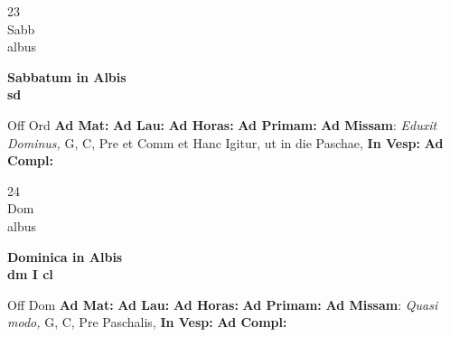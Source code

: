 \documentclass[10pt, openany]{book}
\begin{document}
    \begin{center}
        \begin{minipage}{3.5in}
            \vspace{2em}
            \begin{minipage}{0.5in}
                {\Huge 23} \\
                {\normalsize Sabb} \\
                {\normalsize albus}
            \end{minipage}
            \begin{minipage}{3.0in}
                \textbf{ \large Sabbatum in Albis \\
                \textnormal{\normalsize sd}} \\ 
            \end{minipage}
            \begin{justify}Off Ord
                \textbf{Ad Mat: }
                \textbf{Ad Lau: }
                \textbf{Ad Horas: }
                \textbf{Ad Primam: }\textbf{Ad Missam}: \textit{Eduxit Dominus,} G, C, Pre et Comm et Hanc Igitur, ut in die Paschae,  
                \textbf{In Vesp: }
                \textbf{Ad Compl: }
            \end{justify}
        \end{minipage}
    \end{center}

    \begin{center}
        \begin{minipage}{3.5in}
            \vspace{2em}
            \begin{minipage}{0.5in}
                {\Huge 24} \\
                {\normalsize Dom} \\
                {\normalsize albus}
            \end{minipage}
            \begin{minipage}{3.0in}
                \textbf{ \large Dominica in Albis \\
                \textnormal{\normalsize dm I cl}} \\ 
            \end{minipage}
            \begin{justify}Off Dom
                \textbf{Ad Mat: }
                \textbf{Ad Lau: }
                \textbf{Ad Horas: }
                \textbf{Ad Primam: }\textbf{Ad Missam}: \textit{Quasi modo,} G, C, Pre Paschalis,  
                \textbf{In Vesp: }
                \textbf{Ad Compl: }
            \end{justify}
        \end{minipage}
    \end{center}
\end{document}
